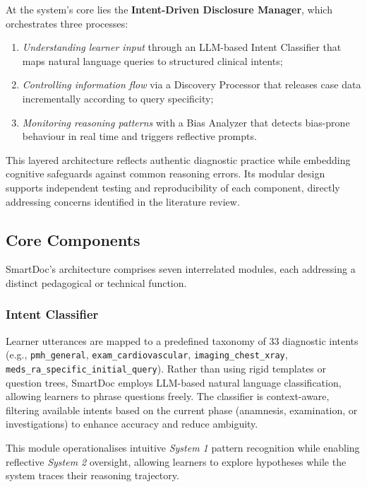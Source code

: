 At the system’s core lies the \textbf{Intent-Driven Disclosure Manager}, which
orchestrates three processes:

\begin{enumerate}
  \item \textit{Understanding learner input} through an LLM-based Intent
  Classifier that maps natural language queries to structured clinical intents;
  \item \textit{Controlling information flow} via a Discovery Processor that
  releases case data incrementally according to query specificity;
  \item \textit{Monitoring reasoning patterns} with a Bias Analyzer that detects
  bias-prone behaviour in real time and triggers reflective prompts.
\end{enumerate}

This layered architecture reflects authentic diagnostic practice while embedding
cognitive safeguards against common reasoning errors.
Its modular design supports independent testing and reproducibility of each
component, directly addressing concerns identified in the literature review.

\subsection{Core Components}

SmartDoc’s architecture comprises seven interrelated modules, each addressing a
distinct pedagogical or technical function.

\subsubsection{Intent Classifier}

Learner utterances are mapped to a predefined taxonomy of 33 diagnostic intents
(e.g., \texttt{pmh\_general}, \texttt{exam\_cardiovascular},
\texttt{imaging\_chest\_xray}, \texttt{meds\_ra\_specific\_initial\_query}).
Rather than using rigid templates or question trees, SmartDoc employs
LLM-based natural language classification, allowing learners to phrase questions
freely.
The classifier is context-aware, filtering available intents based on the current
phase (anamnesis, examination, or investigations) to enhance accuracy and reduce
ambiguity.

This module operationalises intuitive \textit{System 1} pattern recognition
while enabling reflective \textit{System 2} oversight, allowing learners to
explore hypotheses while the system traces their reasoning trajectory.

